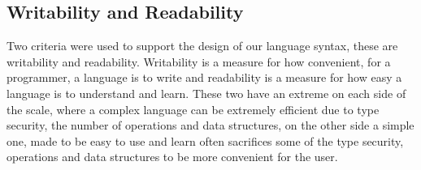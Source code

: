 \subsection*{Writability and Readability}
Two criteria were used to support the design of our language syntax, these are writability and readability. Writability is a measure for how convenient, for a programmer, a language is to write and readability is a measure for how easy a language is to understand and learn. These two have an extreme on each side of the scale, where a complex language can be extremely efficient due to type security, the number of operations and data structures, on the other side a simple one, made to be easy to use and learn often sacrifices some of the type security, operations and data structures to be more convenient for the user.
\begin{comment}
\begin{tabular}{l l l}
$< \texttt{if\_stmt}>$ & $\rightarrow$ $ \textbf{\texttt{if}} \; ( < \texttt{expression} > ) \;  < \texttt{statement} > \; [ \textbf{\texttt{else}} \; < \texttt{statement} > ]$
\end{tabular}

With use of \ac{bnf} the statement would be desriped \\

\begin{tabular}{l l l}
$< \texttt{if\_stmt}>$ & $\rightarrow$ &  $\textbf{\texttt{if}}  \; ( < \texttt{expression} > ) \;  < \texttt{statement} >$ \\
 & $|$ & $ \textbf{\texttt{if}} \; ( < \texttt{expression} > ) \;  < \texttt{statement} > \; \textbf{\texttt{else}} \; < \texttt{statement} > $
\end{tabular}
\end{comment}

